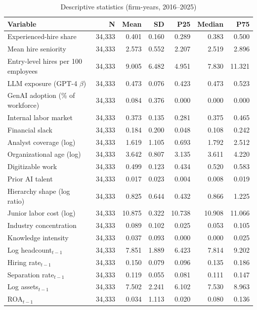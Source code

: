 \begin{table}[!htbp]\centering\footnotesize
\caption{Descriptive statistics (firm-years, 2016--2025)}\label{tab:desc}
\begin{tabular}{lrrrrrr}
\toprule
Variable & N & Mean & SD & P25 & Median & P75 \\
\midrule
Experienced-hire share & 34,333 & 0.401 & 0.160 & 0.289 & 0.383 & 0.500 \\
Mean hire seniority & 34,333 & 2.573 & 0.552 & 2.207 & 2.519 & 2.896 \\
Entry-level hires per 100 employees & 34,333 & 9.005 & 6.482 & 4.951 & 7.830 & 11.321 \\
LLM exposure (GPT-4 $\beta$) & 34,333 & 0.473 & 0.076 & 0.423 & 0.473 & 0.523 \\
GenAI adoption (\% of workforce) & 34,333 & 0.084 & 0.376 & 0.000 & 0.000 & 0.000 \\
Internal labor market & 34,333 & 0.373 & 0.135 & 0.281 & 0.375 & 0.465 \\
Financial slack & 34,333 & 0.184 & 0.200 & 0.048 & 0.108 & 0.242 \\
Analyst coverage (log) & 34,333 & 1.619 & 1.105 & 0.693 & 1.792 & 2.512 \\
Organizational age (log) & 34,333 & 3.642 & 0.807 & 3.135 & 3.611 & 4.220 \\
Digitizable work & 34,333 & 0.499 & 0.123 & 0.434 & 0.520 & 0.583 \\
Prior AI talent & 34,333 & 0.017 & 0.023 & 0.004 & 0.008 & 0.019 \\
Hierarchy shape (log ratio) & 34,333 & 0.825 & 0.644 & 0.432 & 0.866 & 1.225 \\
Junior labor cost (log) & 34,333 & 10.875 & 0.322 & 10.738 & 10.908 & 11.066 \\
Industry concentration & 34,333 & 0.089 & 0.102 & 0.025 & 0.053 & 0.105 \\
Knowledge intensity & 34,333 & 0.037 & 0.093 & 0.000 & 0.000 & 0.025 \\
Log headcount$_{t-1}$ & 34,333 & 7.851 & 1.889 & 6.423 & 7.814 & 9.202 \\
Hiring rate$_{t-1}$ & 34,333 & 0.150 & 0.079 & 0.096 & 0.135 & 0.186 \\
Separation rate$_{t-1}$ & 34,333 & 0.119 & 0.055 & 0.081 & 0.111 & 0.147 \\
Log assets$_{t-1}$ & 34,333 & 7.502 & 2.241 & 6.102 & 7.530 & 8.963 \\
ROA$_{t-1}$ & 34,333 & 0.034 & 1.113 & 0.020 & 0.080 & 0.136 \\

\end{tabular}
\end{table}
